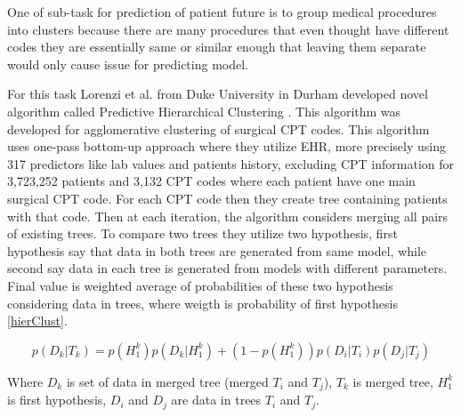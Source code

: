 
One of sub-task for prediction of patient future is to group medical procedures into clusters because there are many procedures that even thought have different codes they are essentially same or similar enough that leaving them separate would only cause issue for predicting model.

For this task Lorenzi et al. from Duke University in Durham developed novel algorithm called Predictive Hierarchical Clustering \cite{lorenzi2017predictive}. This algorithm was developed for agglomerative clustering of surgical CPT codes. This algorithm uses one-pass bottom-up approach where they utilize EHR, more precisely using 317 predictors like lab values and patients history, excluding CPT information for 3,723,252 patients and 3,132 CPT codes where each patient have one main surgical CPT code. For each CPT code then they create tree containing patients with that code. Then at each iteration, the algorithm considers merging all pairs of existing trees. To compare two trees they utilize two hypothesis, first hypothesis say that data in both trees are generated from same model, while second say data in each tree is generated from models with different parameters. Final value is weighted average of probabilities of these two hypothesis considering data in trees, where weigth is probability of first hypothesis \ref{hierClust}.

\begin{equation}
	\label{hierClust}
	p(D_k \vert T_k) = p(H_1^k)p(D_k \vert H_1^k) + (1 - p(H_1^k))p(D_i \vert T_i)p(D_j \vert T_j)
\end{equation} 

Where $D_k$ is set of data in merged tree (merged $T_i$ and $T_j$), $T_k$ is merged tree, $H_1^k$ is first hypothesis, $D_i$ and $D_j$ are data in trees $T_i$ and $T_j$.